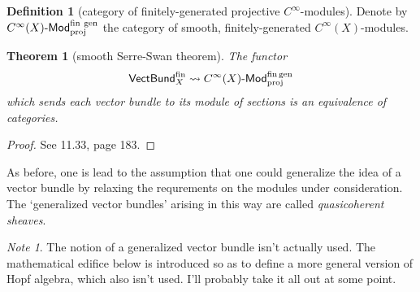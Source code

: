 \documentclass[a4paper,10pt]{scrreprt}
\def\mhyp{{\hbox{-}}}
\theoremstyle{definition}
\newtheorem{definition}{Definition}[section]
\theoremstyle{plain}
\newtheorem{theorem}{Theorem}[section]
\theoremstyle{remark}
\newtheorem{note}{Note}[section]
\begin{document}
\begin{definition}[category of finitely-generated projective $C^{\infty}$-modules]
  \label{def:categoryofyaddayaddasmoothmodules}
  Denote by $C^{\infty}(X)\mhyp\mathsf{Mod}_{\mathrm{proj}}^{\mathrm{fin\ gen}}$ the category of smooth, finitely-generated $C^{\infty}(X)$-modules.
\end{definition}

\begin{theorem}[smooth Serre-Swan theorem]
  The functor 
  \begin{equation*}
    \mathsf{VectBund}^{\mathrm{fin}}_{X} \rightsquigarrow C^{\infty}(X)\mhyp\mathsf{Mod}^{\mathrm{fin\,gen}}_{\mathrm{proj}}
  \end{equation*}
  which sends each vector bundle to its module of sections is an equivalence of categories.
\end{theorem}
\begin{proof}
  See \cite{nestruev-smooth-manifolds-observables} 11.33, page 183.
\end{proof}

As before, one is lead to the assumption that one could generalize the idea of a vector bundle by relaxing the requrements on the modules under consideration. The `generalized vector bundles' arising in this way are called \emph{quasicoherent sheaves}.

\begin{note}
  The notion of a generalized vector bundle isn't actually used. The mathematical edifice below is introduced so as to define a more general version of Hopf algebra, which also isn't used. I'll probably take it all out at some point.
\end{note}
\end{document}
